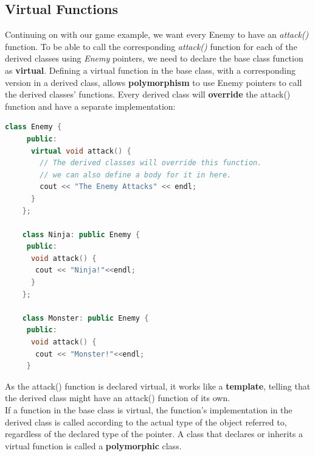 \documentclass[12pt , a4paper]{article}
\begin{document}
	\subsection{Virtual Functions}
Continuing on with our game example, we want every Enemy to have an \textit{attack()} function.
To be able to call the corresponding \textit{attack()} function for each of the derived classes using \textit{Enemy} pointers, we need to declare the base class function as \textbf{virtual}.
Defining a virtual function in the base class, with a corresponding version in a derived class, allows\textbf{ polymorphism} to use Enemy pointers to call the derived classes' functions.
Every derived class will \textbf{override} the attack() function and have a separate implementation:\\
	\begin{lstlisting}[language=C++]
	class Enemy {
	 public:
	  virtual void attack() {
		// The derived classes will override this function.
		// we can also define a body for it in here.
		cout << "The Enemy Attacks" << endl;
	  }
	};
	
	class Ninja: public Enemy {
	 public:
	  void attack() {
	   cout << "Ninja!"<<endl;
	  }
	};
	
	class Monster: public Enemy {
	 public:
	  void attack() {
	   cout << "Monster!"<<endl;
	 }		
	\end{lstlisting}

As the attack() function is declared virtual, it works like a \textbf{template}, telling that the derived class might have an attack() function of its own.\\
If a function in the base class is virtual, the function's implementation in the derived class is called according to the actual type of the object referred to, regardless of the declared type of the pointer.
A class that declares or inherits a virtual function is called a \textbf{polymorphic} class.
\end{document}

